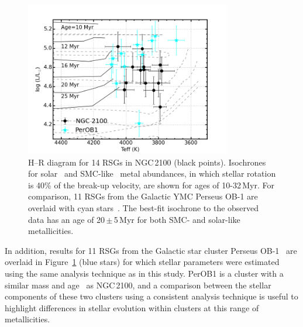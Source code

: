 \documentclass[useAMS,usenatbib]{mn2e}
\begin{document}
\begin{figure}
 \includegraphics[width=9.0cm]{NGC2100-HRD-perOB1}
 \caption{H--R diagram for 14 RSGs in NGC\,2100 (black points).
  Isochrones for solar~\citep[dashed grey lines;][]{2012A&A...537A.146E} and SMC-like~\citep[solid black lines;][]{2013A&A...558A.103G} metal abundances,
  in which stellar rotation is 40\% of the break-up velocity, are shown for ages of 10-32\,Myr. For comparison, 11 RSGs from the Galactic YMC Perseus OB-1 are overlaid with cyan stars~\citep{2014ApJ...788...58G}.
  The best-fit isochrone to the observed data has an age of 20\,$\pm$\,5\,Myr for both SMC- and solar-like metallicities.
  \label{fig:HRD}
          }
\end{figure}

In addition, results for 11 RSGs from the Galactic star cluster Perseus OB-1~\citep[PerOB1;][]{2014ApJ...787..142G} are overlaid in Figure~\ref{fig:HRD} (blue stars) for which stellar parameters were estimated using the same analysis technique as in this study.
PerOB1 is a cluster with a similar mass and age~\citep[$2\times10^{4}\,$M$_{\odot}$ and 14\,Myr respectively;][]{2010ApJS..186..191C}
as NGC\,2100, and a comparison between the stellar components of these two clusters using a consistent analysis technique is useful to highlight differences in stellar evolution within clusters at this range of metallicities.
\end{document}
